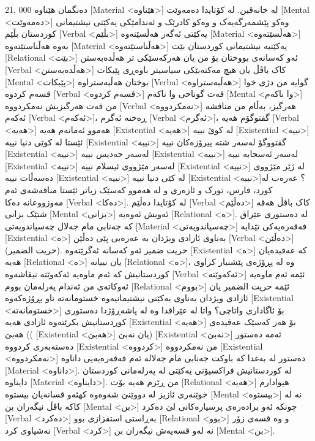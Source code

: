 21, 000 دەنگمان هێناوە [Material <هێناوە>] لە خانەقین. لە کۆتایدا دەمەوێت [Mental <دەمەوێت>] وەکو پێشمەرگەیەک و وەکو کادرێک و ئەندامێکی یەکێتی نیشتیمانی کوردستان بڵێم [Verbal <بڵێم>] یەکێتی ئەگەر هەڵسێتەوە [Material <هەڵسێتەوە>] بەوە هەڵناستێتەوە [Material <هەڵناستێتەوە>] یەکێتیە نیشتیمانی کوردستان بێت [Relational <بێت>] ئەو کەسانەی بووختان بۆ من یان هەرکەسێکی تر هەڵدەبەستن [Verbal <هەڵدەبەستن>] کاک باڤڵ یان هیچ مەکتەبێکی سیاسیتر باوەڕی پێبکات [Mental <پێبکات>] بوختان هەڵبەستراوە [Verbal <هەڵبەستراوە>] گوایە من دژی خوا قسەم کردوە [Verbal <قسەم کردوە>] قەت گوناحی وا ناکەم [Mental <وا ناکەم>] من قەت هەرگیزیش نەمکردووە [Verbal <نەمکردووە>] هەرگیز، بەڵام من مناقشە ئەکەم [Verbal <ئەکەم>]، ڕەخنە ئەگرم [Verbal <ئەگرم>]، گفتوگۆم هەیە [Verbal <هەیە>] هەموو ئەمانەم هەیە [Existential <هەیە>] لە کوێ نییە [Existential <نییە>] ئێستا لە کوێی دنیا نییە [Existential <نییە>] گفتووگۆ لەسەر شتە پیرۆزەکان نییە [Existential <نییە>] لەسەر حەدیس نییە [Existential <نییە>] لەسەر ئەسحابە نییە [Existential <نییە>] لەسەر مێژووی ئیسلام نییە [Existential <نییە>] لە ژێر مێژووی دەسەڵات نییە [Existential <نییە>] لە کێی دنیا نییە [Existential <نییە>]؟ عەرەب لە کورد، فارس، تورک و ئازەری و لە هەموو کەسێک زیاتر ئێستا مناقەشەی ئەم مەوزووعانە دەکا [Verbal <دەکا>].
لە کۆتایدا دەڵێم [Verbal <دەڵێم>] کاک باڤڵ هەقە شتێک بزانی [Mental <بزانی>] ئەویش ئەوەیە [Relational <ە>].
لە دەستوری عێراق کە جەنابی مام جەلال چەسپاندویەتی [Material <چەسپاندویەتی>] فەقەرەیەکی تێدایە [Existential <ە>] بەناوی ئازادی ویژدان بە عەرەبی پێی دەڵێن [Verbal <دەڵێن>] (حریت الضمیر). حریت ضمیر ئەو کەسانە ئەگرێتەوە [Existential <ە>] کە عەقیدەیان هەیە [Relational <ە>] یان نییانە [Relational <ە>]، وە لە پڕۆژەی پێشنیار کراوی کوردستانیش کە ئەم ماوەیە ئەکەوێتە نیقاشەوە [Verbal <ئەکەوێتە>] ئێمە ئەم ماوەیە ئەوکاتەی من ئەندام پەرلەمان بووم [Relational <بووم>] ئێمە حریت الضمیر یان ئازادی ویژدان بەناوی یەکێتی نیشتیمانیەوە خستومانەتە ناو پڕۆژەکەوە [Existential <خستومانەتە>] بۆ ئاگاداری واتاچی؟ واتا لە عێراقدا وە لە پاشەڕۆژدا دەستوری کوردستانیش بکرێتەوە ئازادی هەیە [Existential <هەیە>] بۆ هەر کەسێک عەقیدەی هەبێ (( [Existential <هەبێ>] یان نەبێ) [Existential <نەبێ>] ئەمە دەستور دەستەبەری کردووە [Existential <کردووە>] من نەمکردووە [Existential <نەمکردووە>] دەستور لە بەغدا کە باوکت جەنابی مام جەلالە ئەم فەقەرەیەیی داناوە [Material <داناوە>].
لە کوردستانیش فراکسیۆنی یەکێتی لە پەرلەمانی کوردستان دایناوە [Material <دایناوە>]. من ڕێزم هەیە بۆت [Relational <هەیە>] هیوادارم خوێنەری ئازیز لە دووێنێ شەوەوە کهئەو قسانەیان بیستوە [Mental <بیستوە>] نە لە کاکە باڤڵ نیگەران بن [Mental <بن>] چونکە ئەو برادەرەی پرسیارەکانی لێ دەکرد [Verbal <دەکرد>] بەڕاستی استفزازی بوو [Relational <بوو>] و وە قسەی زۆر نەشیاوی کرد [Verbal <کرد>] نە لەو قسەیەش نیگەران بن [Mental <بن>].
